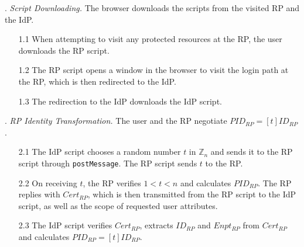 \vspace{0.4mm}
. {\em Script Downloading.}
The browser downloads the scripts from the visited RP and the IdP.
\vspace{-\topsep}
\begin{itemize}
\setlength{\topsep}{0pt}
\setlength{\partopsep}{0pt}
\setlength{\itemsep}{0pt}
\setlength{\parsep}{0pt}
\setlength{\parskip}{0pt}
\item[1.1]
When attempting to visit any protected resources at the RP,
    the user downloads the RP script.
\item[1.2]
The RP script opens a window in the browser to visit the login path at the RP, which is then redirected to the IdP.
\item[1.3]
The redirection to the IdP downloads the IdP script.
\end{itemize}



. {\em RP Identity Transformation.}
The user and the RP negotiate $PID_{RP} = [t]{ID_{RP}}$.
\vspace{-\topsep}
\begin{itemize}
\setlength{\topsep}{0pt}
\setlength{\partopsep}{0pt}
\setlength{\itemsep}{0pt}
\setlength{\parsep}{0pt}
\setlength{\parskip}{0pt}
\item[2.1] The IdP script chooses a random number $t$ in $\mathbb{Z}_n$ and sends it to the RP script through \verb+postMessage+.
The RP script sends $t$ to the RP.
\item[2.2] On receiving $t$,
the RP verifies $1 < t < n$ and calculates $PID_{RP}$.
The RP replies with $Cert_{RP}$, which is then transmitted from the RP script to the IdP script,
    as well as the scope of requested user attributes.  %
\item[2.3] The IdP script verifies $Cert_{RP}$, extracts $ID_{RP}$ and $Enpt_{RP}$ from $Cert_{RP}$ and calculates $PID_{RP}=[t]{ID_{RP}}$.

\end{itemize}


